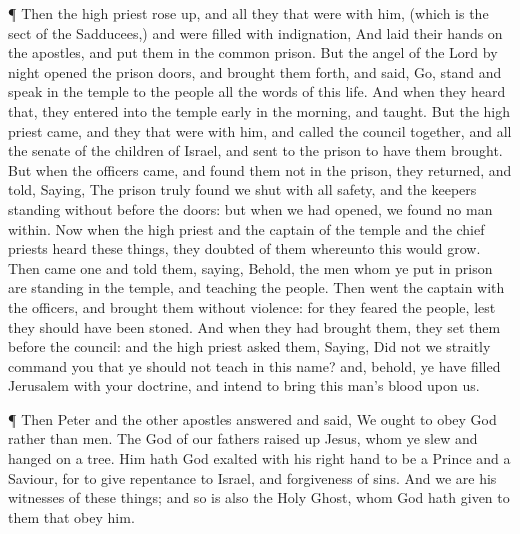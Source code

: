  ¶ Then the high priest rose up, and all they that were
with him, (which is the sect of the Sadducees,) and were filled with
indignation,  And laid their hands on the apostles, and put
them in the common prison.  But the angel of the Lord by
night opened the prison doors, and brought them forth, and said,
 Go, stand and speak in the temple to the people all the
words of this life.  And when they heard that, they entered
into the temple early in the morning, and taught. But the high priest
came, and they that were with him, and called the council together, and
all the senate of the children of Israel, and sent to the prison to have
them brought.  But when the officers came, and found them
not in the prison, they returned, and told,  Saying, The
prison truly found we shut with all safety, and the keepers standing
without before the doors: but when we had opened, we found no man
within.  Now when the high priest and the captain of the
temple and the chief priests heard these things, they doubted of them
whereunto this would grow.  Then came one and told them,
saying, Behold, the men whom ye put in prison are standing in the
temple, and teaching the people.  Then went the captain
with the officers, and brought them without violence: for they feared
the people, lest they should have been stoned.  And when
they had brought them, they set them before the council: and the high
priest asked them,  Saying, Did not we straitly command you
that ye should not teach in this name? and, behold, ye have filled
Jerusalem with your doctrine, and intend to bring this man's blood upon
us.

 ¶ Then Peter and the other apostles answered and said, We
ought to obey God rather than men.  The God of our fathers
raised up Jesus, whom ye slew and hanged on a tree.  Him
hath God exalted with his right hand to be a Prince and a Saviour, for
to give repentance to Israel, and forgiveness of sins.  And
we are his witnesses of these things; and so is also the Holy Ghost,
whom God hath given to them that obey him.

